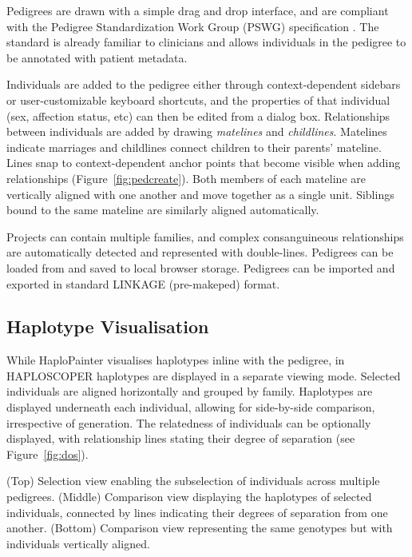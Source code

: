 \documentclass{assets/biotemplate/bioinfo}
\numberwithin{equation}{section}
\def\haplo{{HAPLOSCOPER}}            %
\def\hpainter{{HaploPainter}}
\begin{document}
Pedigrees are drawn with a simple drag and drop interface, and are compliant with the Pedigree Standardization Work Group (PSWG) specification \citep{pswg1,pswg2}. The standard is already familiar to clinicians and allows individuals in the pedigree to be annotated with patient metadata. 

Individuals are added to the pedigree either through context-dependent sidebars or user-customizable keyboard shortcuts, and the properties of that individual (sex, affection status, etc) can then be edited from a dialog box. Relationships between individuals are added by drawing {\it matelines} and {\it childlines}. Matelines indicate marriages and childlines connect children to their parents' mateline. Lines snap to context-dependent anchor points that become visible when adding relationships (Figure~\ref{fig:pedcreate}). Both members of each mateline are vertically aligned with one another and move together as a single unit. Siblings bound to the same mateline are similarly aligned automatically.

Projects can contain multiple families, and complex consanguineous relationships are automatically detected and represented with double-lines. Pedigrees can be loaded from and saved to local browser storage. Pedigrees can be imported and exported in standard LINKAGE (pre-makeped) format.
	
\subsection{Haplotype Visualisation}


While \hpainter{} visualises haplotypes inline with the pedigree, in \haplo{} haplotypes are displayed in a separate viewing mode.
%
Selected individuals are aligned horizontally and grouped by family. Haplotypes are displayed underneath each individual, allowing for side-by-side comparison, irrespective of generation. The relatedness of individuals can be optionally displayed, with relationship lines stating their degree of separation (see Figure~\ref{fig:dos}). 
%


	{(Top) Selection view enabling the subselection of individuals across multiple pedigrees. (Middle) Comparison view displaying the haplotypes of selected individuals, connected by lines indicating their degrees of separation from one another. (Bottom) Comparison view representing the same genotypes but with individuals vertically aligned.}
\end{document}
